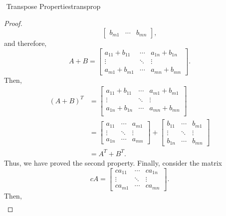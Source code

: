 \begin{theorem}{\Stop\,\,Transpose Properties}{transprop}
\begin{proof}
\begin{equation*}
\begin{bmatrix}
                    b_{m1} & \cdots & b_{mn} \end{bmatrix},
                \end{equation*}
                and therefore,
                \begin{equation*}
                    A+B=\begin{bmatrix} a_{11}+b_{11} & \cdots & a_{1n}+b_{1n} \\ \vdots & \ddots & \vdots \\
                    a_{m1}+b_{m1} & \cdots & a_{mn}+b_{mn} \end{bmatrix}.
                \end{equation*}
                Then,
                \begin{align*}
                    (A+B)^T&=\begin{bmatrix} a_{11}+b_{11} & \cdots & a_{m1}+b_{m1} \\ \vdots & \ddots & \vdots \\ a_{1n}+b_{1n} & \cdots & a_{mn}+b_{mn} \\
                    \end{bmatrix} \\
                    &=\begin{bmatrix} a_{11} & \cdots & a_{m1} \\
                    \vdots & \ddots & \vdots \\
                    a_{1n} & \cdots & a_{mn} \end{bmatrix}+\begin{bmatrix} b_{11} & \cdots & b_{m1} \\
                    \vdots & \ddots & \vdots \\
                    b_{1n} & \cdots & b_{mn} \end{bmatrix} \\
                    &=A^T+B^T.
                \end{align*}
                Thus, we have proved the second property. Finally, consider the matrix
                \begin{equation*}
                    cA=\begin{bmatrix} ca_{11} & \cdots & ca_{1n} \\ \vdots & \ddots & \vdots \\
                    ca_{m1} & \cdots & ca_{mn} \end{bmatrix}.
                \end{equation*}
                Then,
                \begin{align*}

\end{align*}
\end{proof}
\end{theorem}
